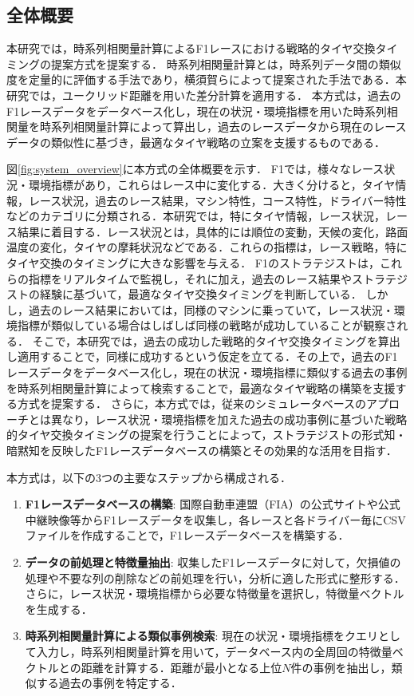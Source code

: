 \documentclass{deimj}
\begin{document}
\subsection{全体概要}

本研究では，時系列相関量計算によるF1レースにおける戦略的タイヤ交換タイミングの提案方式を提案する．
時系列相関量計算とは，時系列データ間の類似度を定量的に評価する手法であり，横須賀ら\cite{deim2024_timeseries}によって提案された手法である．本研究では，ユークリッド距離を用いた差分計算を適用する．
本方式は，過去のF1レースデータをデータベース化し，現在の状況・環境指標を用いた時系列相関量を時系列相関量計算によって算出し，過去のレースデータから現在のレースデータの類似性に基づき，最適なタイヤ戦略の立案を支援するものである．

図\ref{fig:system_overview}に本方式の全体概要を示す．
F1では，様々なレース状況・環境指標があり，これらはレース中に変化する．大きく分けると，タイヤ情報，レース状況，過去のレース結果，マシン特性，コース特性，ドライバー特性などのカテゴリに分類される．本研究では，特にタイヤ情報，レース状況，レース結果に着目する．レース状況とは，具体的には順位の変動，天候の変化，路面温度の変化，タイヤの摩耗状況などである．これらの指標は，レース戦略，特にタイヤ交換のタイミングに大きな影響を与える．
F1のストラテジストは，これらの指標をリアルタイムで監視し，それに加え，過去のレース結果やストラテジストの経験に基づいて，最適なタイヤ交換タイミングを判断している．
しかし，過去のレース結果においては，同様のマシンに乗っていて，レース状況・環境指標が類似している場合はしばしば同様の戦略が成功していることが観察される．
そこで，本研究では，過去の成功した戦略的タイヤ交換タイミングを算出し適用することで，同様に成功するという仮定を立てる．その上で，過去のF1レースデータをデータベース化し，現在の状況・環境指標に類似する過去の事例を時系列相関量計算によって検索することで，最適なタイヤ戦略の構築を支援する方式を提案する．
さらに，本方式では，従来のシミュレータベースのアプローチとは異なり，レース状況・環境指標を加えた過去の成功事例に基づいた戦略的タイヤ交換タイミングの提案を行うことによって，ストラテジストの形式知・暗黙知を反映したF1レースデータベースの構築とその効果的な活用を目指す．

本方式は，以下の3つの主要なステップから構成される．
\begin{enumerate}
  \item \textbf{F1レースデータベースの構築}: 国際自動車連盟（FIA）の公式サイトや公式中継映像等からF1レースデータを収集し，各レースと各ドライバー毎にCSVファイルを作成することで，F1レースデータベースを構築する．
  \item \textbf{データの前処理と特徴量抽出}: 収集したF1レースデータに対して，欠損値の処理や不要な列の削除などの前処理を行い，分析に適した形式に整形する．さらに，レース状況・環境指標から必要な特徴量を選択し，特徴量ベクトルを生成する．
  \item \textbf{時系列相関量計算による類似事例検索}: 現在の状況・環境指標をクエリとして入力し，時系列相関量計算を用いて，データベース内の全周回の特徴量ベクトルとの距離を計算する．距離が最小となる上位$N$件の事例を抽出し，類似する過去の事例を特定する．
\end{enumerate} 
\end{document}
